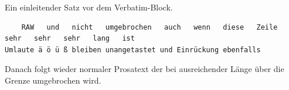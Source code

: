 Ein einleitender Satz vor dem Verbatim-Block.
\begin{verbatim}
    RAW   und   nicht   umgebrochen   auch   wenn   diese   Zeile   sehr   sehr   sehr   lang   ist
Umlaute ä ö ü ß bleiben unangetastet und Einrückung ebenfalls
\end{verbatim}
  Danach folgt wieder normaler Prosatext der bei ausreichender Länge über die Grenze umgebrochen
  wird.

